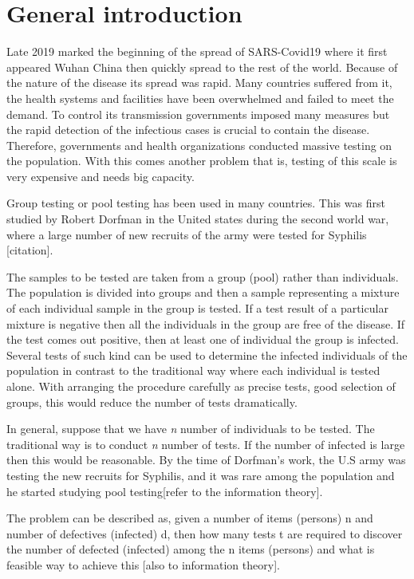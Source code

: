 \documentclass[12pt,a4paper]{article}
\begin{document}
	\section{General introduction}
	Late 2019 marked the beginning of the spread of SARS-Covid19 where it first appeared Wuhan China then quickly spread to the rest of the world. Because of the nature of the disease its spread was rapid. Many countries suffered from it, the health systems and facilities have been overwhelmed and failed to meet the demand. To control its transmission governments imposed many measures but the rapid detection of the infectious cases is crucial to contain the disease. Therefore, governments and health organizations conducted massive testing on the population. With this comes another problem that is, testing of this scale is very expensive and needs big capacity.  
	
	Group  testing or pool testing has been used in many countries. This was first studied by Robert Dorfman in the United states during the second world war, where a large number of new recruits of the army were tested for Syphilis [citation].
	 
	The samples to be tested are taken from a group (pool) rather than individuals. The population is divided into groups and then a sample representing a mixture of each individual sample in the group is tested. If a test result of a particular mixture is negative then all the individuals in the group are free of the disease. If the test comes out positive, then at least one of individual the group is infected. Several tests of such kind can be used to determine the infected individuals of the population in contrast to the traditional way where each individual is tested alone. With arranging the procedure carefully as precise tests, good selection of groups, this would reduce the number of tests dramatically.       
	
	In general, suppose that we have \textit{n} number of individuals to be tested. The traditional way is to conduct \textit{n} number of tests. If the number of infected is large then this would be reasonable. By the time of Dorfman's work, the U.S army was testing the new recruits for Syphilis, and it was rare among the population and he started studying pool testing[refer to the information theory].
	
	 The problem can be described as, given a number of items (persons) n and number of defectives (infected) d, then how many tests t are required to discover the number of defected (infected) among the n items (persons) and what is feasible way  to achieve this [also to information theory].  
	 
\end{document}
